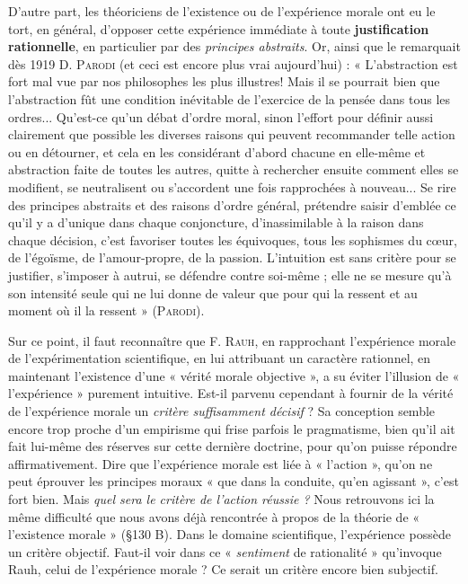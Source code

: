 D’autre part, les théoriciens de l'existence ou de l'expérience
morale ont eu le tort, en général, d’opposer cette expérience immédiate
à toute {\bf justification rationnelle}, en particulier par des {\it principes
abstraits}. Or, ainsi que le remarquait dès 1919 D. \textsc{Parodi}
(et ceci est encore plus vrai aujourd’hui) : « L’abstraction est fort
mal vue par nos philosophes les plus illustres! Mais il se pourrait
bien que l’abstraction fût une condition inévitable de l'exercice de
la pensée dans tous les ordres... Qu'est-ce qu’un débat d’ordre moral,
sinon l'effort pour définir aussi clairement que possible les diverses
raisons qui peuvent recommander telle action ou en détourner, et
cela en les considérant d’abord chacune en elle-même et abstraction
faite de toutes les autres, quitte à rechercher ensuite comment elles
se modifient, se neutralisent ou s’accordent une fois rapprochées à
nouveau... Se rire des principes abstraits et des raisons d’ordre général,
prétendre saisir d'emblée ce qu’il y a d’unique dans chaque conjoncture,
d’inassimilable à la raison dans chaque décision, c’est favoriser
toutes les équivoques, tous les sophismes du cœur, de l’égoïsme,
de l’amour-propre, de la passion. L’intuition est sans critère pour se
justifier, s’imposer à autrui, se défendre contre soi-même ; elle ne se
mesure qu’à son intensité seule qui ne lui donne de valeur que pour
qui la ressent et au moment où il la ressent » (\textsc{Parodi}).

Sur ce point, il faut reconnaître que F. \textsc{Rauh}, en rapprochant
l’expérience morale de l’expérimentation scientifique, en lui attribuant
un caractère rationnel, en maintenant l'existence d’une « vérité
morale objective », a su éviter l’illusion de « l’expérience » purement
intuitive. Est-il parvenu cependant à fournir de la vérité de l’expérience
morale un {\it critère suffisamment décisif} ? Sa conception semble
encore trop proche d’un empirisme qui frise parfois le pragmatisme,
bien qu'il ait fait lui-même des réserves sur cette dernière doctrine,
pour qu’on puisse répondre affirmativement. Dire que l’expérience
morale est liée à « l’action », qu’on ne peut éprouver les principes
moraux « que dans la conduite, qu’en agissant », c’est fort bien.
Mais {\it quel sera le critère de l’action réussie ?} Nous retrouvons ici la
même difficulté que nous avons déjà rencontrée à propos de la théorie
de « l’existence morale » (\S 130 B). Dans le domaine scientifique,
l'expérience possède un critère objectif. Faut-il voir dans ce « {\it sentiment}
de rationalité » qu’invoque Rauh, celui de l’expérience morale ?
Ce serait un critère encore bien subjectif.

